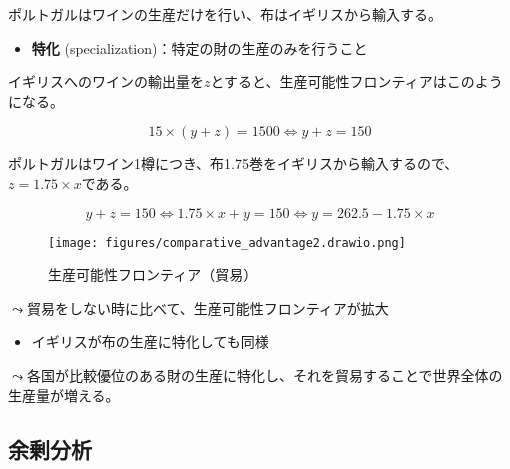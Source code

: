 \documentclass[
  xelatex,
  ja=standard]{bxjsarticle}
\providecommand{\tightlist}{%
  \setlength{\itemsep}{0pt}\setlength{\parskip}{0pt}}\usepackage{longtable,booktabs,array}
\begin{document}
\begin{tcolorbox}[enhanced jigsaw, toprule=.15mm, leftrule=.75mm, coltitle=black, opacityback=0, colback=white, title=\textcolor{quarto-callout-tip-color}{\faLightbulb}\hspace{0.5em}{イギリスとポルトガルの貿易'\,'\,'}, rightrule=.15mm, bottomrule=.15mm, colbacktitle=quarto-callout-tip-color!10!white, opacitybacktitle=0.6, titlerule=0mm, colframe=quarto-callout-tip-color-frame, bottomtitle=1mm, toptitle=1mm, arc=.35mm, left=2mm, breakable]

ポルトガルはワインの生産だけを行い、布はイギリスから輸入する。

\end{tcolorbox}

\begin{itemize}
\tightlist
\item
  \textbf{特化} (specialization)：特定の財の生産のみを行うこと
\end{itemize}

イギリスへのワインの輸出量を\(z\)とすると、生産可能性フロンティアはこのようになる。

\[
15 \times (y + z) = 1500
\Leftrightarrow y + z = 150
\]

ポルトガルはワイン1樽につき、布1.75巻をイギリスから輸入するので、\(z = 1.75 \times x\)である。

\[
y + z = 150
\Leftrightarrow 1.75 \times x + y = 150
\Leftrightarrow y = 262.5 - 1.75 \times x
\]

\begin{figure}[htpb]

{\centering \texttt{[image: figures/comparative\_advantage2.drawio.png]}

}

\caption{生産可能性フロンティア（貿易）}

\end{figure}

\(\leadsto\)貿易をしない時に比べて、生産可能性フロンティアが拡大

\begin{itemize}
\tightlist
\item
  イギリスが布の生産に特化しても同様
\end{itemize}

\(\leadsto\)各国が比較優位のある財の生産に特化し、それを貿易することで世界全体の生産量が増える。

\hypertarget{ux4f59ux5270ux5206ux6790}{%
\subsection{余剰分析}\label{ux4f59ux5270ux5206ux6790}}
\end{document}
